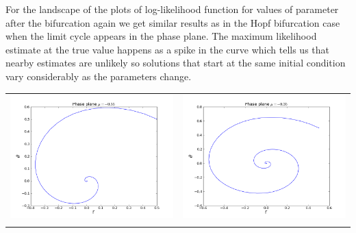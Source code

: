 \documentclass[12pt,a4paper,titlepage]{article}
\begin{document}
For the landscape of the plots of log-likelihood function for values of parameter after the bifurcation again we get similar results as in the Hopf bifurcation case when the limit cycle appears in the phase plane. The maximum likelihood estimate at the true value happens as a spike in the curve which tells us that nearby estimates are unlikely so solutions that start at the same initial condition vary considerably as the parameters change. 
\begin{table}[ht]
\centering
\begin{tabular}{cc}
\includegraphics[scale=0.3]{phase_snic055m}&\includegraphics[scale=0.3]{phase_snic035m}\\
\newline

\end{tabular}
\end{table}
\end{document}
